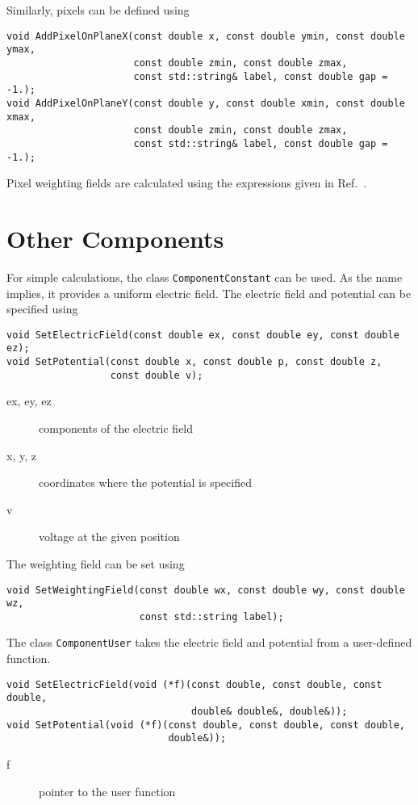 Similarly, pixels can be defined using
\begin{lstlisting}
void AddPixelOnPlaneX(const double x, const double ymin, const double ymax,
                      const double zmin, const double zmax,
                      const std::string& label, const double gap = -1.);
void AddPixelOnPlaneY(const double y, const double xmin, const double xmax,
                      const double zmin, const double zmax,
                      const std::string& label, const double gap = -1.);
\end{lstlisting}
Pixel weighting fields are calculated using the expressions given in 
Ref.~\cite{Riegler2014}.
\section{Other Components}

For simple calculations, the class \texttt{ComponentConstant} can be used. 
As the name implies, it provides a uniform electric field. 
The electric field and potential can be specified using
\begin{lstlisting}
void SetElectricField(const double ex, const double ey, const double ez);
void SetPotential(const double x, const double p, const double z,
                  const double v);
\end{lstlisting}
\begin{description}
  \item[ex, ey, ez]
  components of the electric field
  \item[x, y, z]
  coordinates where the potential is specified
  \item[v]
  voltage at the given position
\end{description}
The weighting field can be set using
\begin{lstlisting}
void SetWeightingField(const double wx, const double wy, const double wz,
                       const std::string label);
\end{lstlisting}

The class \texttt{ComponentUser} takes the electric field and potential
from a user-defined function.
\begin{lstlisting}
void SetElectricField(void (*f)(const double, const double, const double, 
                                double& double&, double&));
void SetPotential(void (*f)(const double, const double, const double, 
                            double&));
\end{lstlisting}
\begin{description}
  \item[f] pointer to the user function
\end{description}

